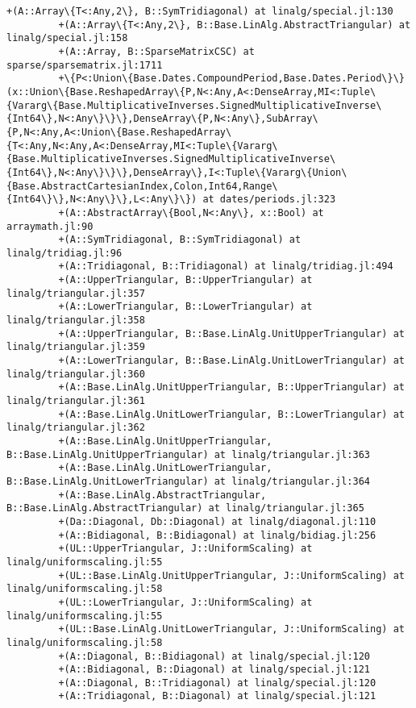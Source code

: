 \documentclass[11pt]{article}
\begin{document}
\begin{Verbatim}[commandchars=\\\{\}]
         +(A::Array\{T<:Any,2\}, B::SymTridiagonal) at linalg/special.jl:130
         +(A::Array\{T<:Any,2\}, B::Base.LinAlg.AbstractTriangular) at linalg/special.jl:158
         +(A::Array, B::SparseMatrixCSC) at sparse/sparsematrix.jl:1711
         +\{P<:Union\{Base.Dates.CompoundPeriod,Base.Dates.Period\}\}(x::Union\{Base.ReshapedArray\{P,N<:Any,A<:DenseArray,MI<:Tuple\{Vararg\{Base.MultiplicativeInverses.SignedMultiplicativeInverse\{Int64\},N<:Any\}\}\},DenseArray\{P,N<:Any\},SubArray\{P,N<:Any,A<:Union\{Base.ReshapedArray\{T<:Any,N<:Any,A<:DenseArray,MI<:Tuple\{Vararg\{Base.MultiplicativeInverses.SignedMultiplicativeInverse\{Int64\},N<:Any\}\}\},DenseArray\},I<:Tuple\{Vararg\{Union\{Base.AbstractCartesianIndex,Colon,Int64,Range\{Int64\}\},N<:Any\}\},L<:Any\}\}) at dates/periods.jl:323
         +(A::AbstractArray\{Bool,N<:Any\}, x::Bool) at arraymath.jl:90
         +(A::SymTridiagonal, B::SymTridiagonal) at linalg/tridiag.jl:96
         +(A::Tridiagonal, B::Tridiagonal) at linalg/tridiag.jl:494
         +(A::UpperTriangular, B::UpperTriangular) at linalg/triangular.jl:357
         +(A::LowerTriangular, B::LowerTriangular) at linalg/triangular.jl:358
         +(A::UpperTriangular, B::Base.LinAlg.UnitUpperTriangular) at linalg/triangular.jl:359
         +(A::LowerTriangular, B::Base.LinAlg.UnitLowerTriangular) at linalg/triangular.jl:360
         +(A::Base.LinAlg.UnitUpperTriangular, B::UpperTriangular) at linalg/triangular.jl:361
         +(A::Base.LinAlg.UnitLowerTriangular, B::LowerTriangular) at linalg/triangular.jl:362
         +(A::Base.LinAlg.UnitUpperTriangular, B::Base.LinAlg.UnitUpperTriangular) at linalg/triangular.jl:363
         +(A::Base.LinAlg.UnitLowerTriangular, B::Base.LinAlg.UnitLowerTriangular) at linalg/triangular.jl:364
         +(A::Base.LinAlg.AbstractTriangular, B::Base.LinAlg.AbstractTriangular) at linalg/triangular.jl:365
         +(Da::Diagonal, Db::Diagonal) at linalg/diagonal.jl:110
         +(A::Bidiagonal, B::Bidiagonal) at linalg/bidiag.jl:256
         +(UL::UpperTriangular, J::UniformScaling) at linalg/uniformscaling.jl:55
         +(UL::Base.LinAlg.UnitUpperTriangular, J::UniformScaling) at linalg/uniformscaling.jl:58
         +(UL::LowerTriangular, J::UniformScaling) at linalg/uniformscaling.jl:55
         +(UL::Base.LinAlg.UnitLowerTriangular, J::UniformScaling) at linalg/uniformscaling.jl:58
         +(A::Diagonal, B::Bidiagonal) at linalg/special.jl:120
         +(A::Bidiagonal, B::Diagonal) at linalg/special.jl:121
         +(A::Diagonal, B::Tridiagonal) at linalg/special.jl:120
         +(A::Tridiagonal, B::Diagonal) at linalg/special.jl:121

\end{Verbatim}
\end{document}
